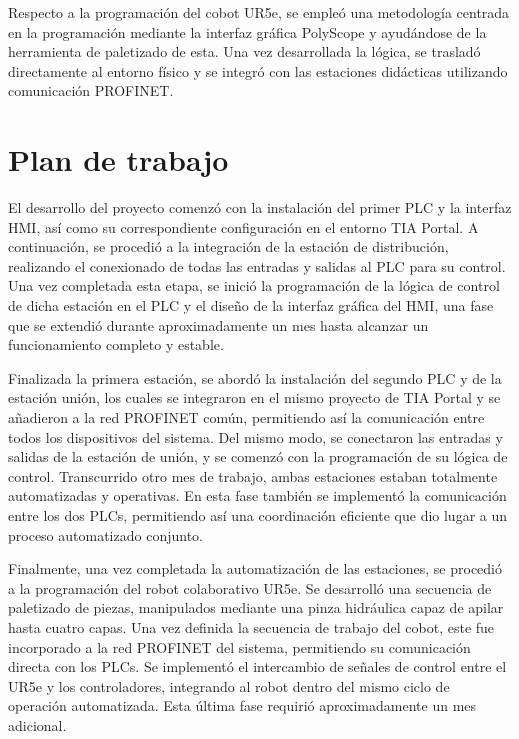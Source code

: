 Respecto a la programación del cobot UR5e, se empleó una metodología centrada en la programación mediante la interfaz gráfica PolyScope y ayudándose de la herramienta de paletizado de esta. Una vez desarrollada la lógica, se trasladó directamente al entorno físico y se integró con las estaciones didácticas utilizando comunicación PROFINET.

\section{Plan de trabajo}
\label{sec:plantrabajo}

El desarrollo del proyecto comenzó con la instalación del primer PLC y la interfaz HMI, así como su correspondiente configuración en el entorno TIA Portal. A continuación, se procedió a la integración de la estación de distribución, realizando el conexionado de todas las entradas y salidas al PLC para su control. Una vez completada esta etapa, se inició la programación de la lógica de control de dicha estación en el PLC y el diseño de la interfaz gráfica del HMI, una fase que se extendió durante aproximadamente un mes hasta alcanzar un funcionamiento completo y estable.

Finalizada la primera estación, se abordó la instalación del segundo PLC y de la estación unión, los cuales se integraron en el mismo proyecto de TIA Portal y se añadieron a la red PROFINET común, permitiendo así la comunicación entre todos los dispositivos del sistema. Del mismo modo, se conectaron las entradas y salidas de la estación de unión, y se comenzó con la programación de su lógica de control. Transcurrido otro mes de trabajo, ambas estaciones estaban totalmente automatizadas y operativas. En esta fase también se implementó la comunicación entre los dos PLCs, permitiendo así una coordinación eficiente que dio lugar a un proceso automatizado conjunto.

Finalmente, una vez completada la automatización de las estaciones, se procedió a la programación del robot colaborativo UR5e. Se desarrolló una secuencia de paletizado de piezas, manipulados mediante una pinza hidráulica capaz de apilar hasta cuatro capas. Una vez definida la secuencia de trabajo del cobot, este fue incorporado a la red PROFINET del sistema, permitiendo su comunicación directa con los PLCs. Se implementó el intercambio de señales de control entre el UR5e y los controladores, integrando al robot dentro del mismo ciclo de operación automatizada. Esta última fase requirió aproximadamente un mes adicional.

